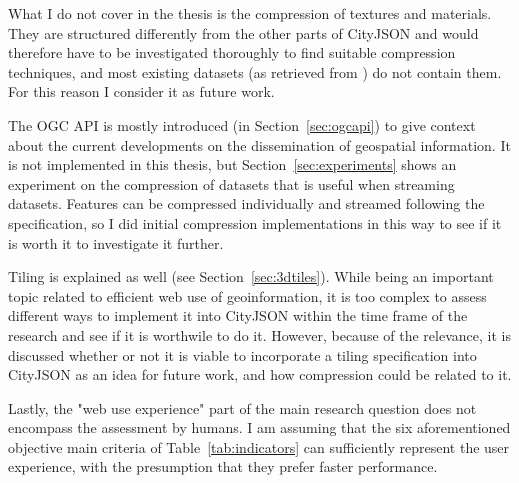 What I do not cover in the thesis is the compression of textures and materials.
They are structured differently from the other parts of CityJSON and would therefore have to be investigated thoroughly to find suitable compression techniques, and most existing datasets (as retrieved from \citet{cityjsondatasets}) do not contain them.
For this reason I consider it as future work.

The OGC API is mostly introduced (in Section~\ref{sec:ogcapi}) to give context about the current developments on the dissemination of geospatial information.
It is not implemented in this thesis, but Section~\ref{sec:experiments} shows an experiment on the compression of datasets that is useful when streaming datasets.
Features can be compressed individually and streamed following the specification, so I did initial compression implementations in this way to see if it is worth it to investigate it further.

Tiling is explained as well (see Section~\ref{sec:3dtiles}).
While being an important topic related to efficient web use of geoinformation, it is too complex to assess different ways to implement it into CityJSON within the time frame of the research and see if it is worthwile to do it.
However, because of the relevance, it is discussed whether or not it is viable to incorporate a tiling specification into CityJSON as an idea for future work, and how compression could be related to it.

Lastly, the "web use experience" part of the main research question does not encompass the assessment by humans.
I am assuming that the six aforementioned objective main criteria of Table~\ref{tab:indicators} can sufficiently represent the user experience, with the presumption that they prefer faster performance.


